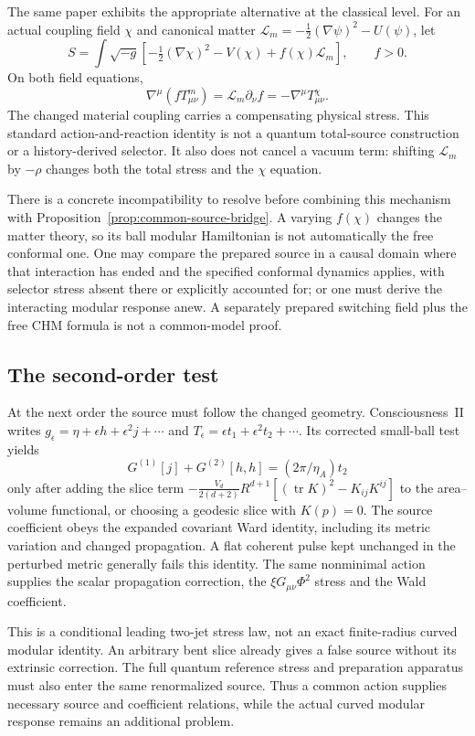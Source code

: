 The same paper exhibits the appropriate alternative at the classical
level. For an actual coupling field $\chi$ and canonical matter
$\mathcal L_m=-\frac12(\nabla\psi)^2-U(\psi)$, let
\[
 S=\int\sqrt{-g}\left[-\tfrac12(\nabla\chi)^2-V(\chi)
                                      +f(\chi)\mathcal L_m\right],
 \qquad f>0 .
\]
On both field equations,
\[
 \nabla^\mu(fT^m_{\mu\nu})=\mathcal L_m\partial_\nu f
                      =-\nabla^\mu T^\chi_{\mu\nu}.
\]
The changed material coupling carries a compensating physical stress.
This standard action-and-reaction identity is not a quantum total-source
construction or a history-derived selector. It also does not cancel a
vacuum term: shifting $\mathcal L_m$ by $-\rho$ changes both the total
stress and the $\chi$ equation.

There is a concrete incompatibility to resolve before combining this
mechanism with Proposition~\ref{prop:common-source-bridge}.
A varying $f(\chi)$ changes the matter theory, so its ball modular
Hamiltonian is not automatically the free conformal one.
One may compare the prepared source in a causal domain where that
interaction has ended and the specified conformal dynamics applies,
with selector stress absent there or explicitly accounted for; or one
must derive the interacting modular response anew.
A separately prepared switching field plus the free CHM formula is
not a common-model proof.

\subsection{The second-order test}

At the next order the source must follow the changed geometry.
Consciousness~II writes
$g_\epsilon=\eta+\epsilon h+\epsilon^2j+\cdots$ and
$T_\epsilon=\epsilon t_1+\epsilon^2t_2+\cdots$.
Its corrected small-ball test yields
\[
 G^{(1)}[j]+G^{(2)}[h,h]=(2\pi/\eta_A)t_2
\]
only after adding the slice term
$-\frac{V_d}{2(d+2)}R^{d+1}
[(\operatorname{tr}K)^2-K_{ij}K^{ij}]$ to the area--volume functional,
or choosing a geodesic slice with $K(p)=0$.
The source coefficient obeys the expanded covariant Ward identity,
including its metric variation and changed propagation. A flat coherent
pulse kept unchanged in the perturbed metric generally fails this identity.
The same nonminimal action supplies the scalar propagation correction,
the $\xi G_{\mu\nu}\Phi^2$ stress and the Wald coefficient.

This is a conditional leading two-jet stress law, not an exact
finite-radius curved modular identity. An arbitrary bent slice already
gives a false source without its extrinsic correction.
The full quantum reference stress and preparation apparatus must also
enter the same renormalized source. Thus a common action supplies
necessary source and coefficient relations, while the actual curved
modular response remains an additional problem.

